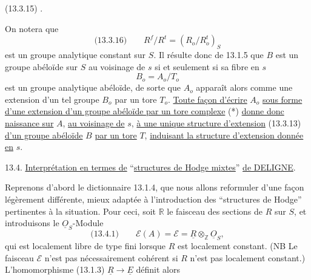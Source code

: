 
(13.3.15)
.

On notera que
\[
\text{(13.3.16)}\qquad R^f/R^t=(R_o/R_o^t)_S
\]
est un groupe analytique constant sur $S$. Il résulte donc de 13.1.5 que $B$ est un groupe abéloïde sur $S$ au voisinage de $s$ si et seulement si sa fibre en $s$
\[
B_o=A_o/T_o
\]
est un groupe analytique abéloïde, de sorte que $A_o$ apparaît alors comme une extension d'un tel groupe $B_o$ par un tore $T_o$. \uline{Toute façon d'écrire} $A_o$ \uline{sous forme d'une extension d'un groupe abéloïde par un tore complexe} (*) \uline{donne donc naissance sur} $A$, \uline{au voisinage de} $s$, \uline{à une unique structure d'extension} (13.3.13) \uline{d'un groupe abéloïde} $B$ \uline{par un tore} $T$, \uline{induisant la structure d'extension donnée en} $s$.

13.4. \uline{Interprétation en termes de} ``\uline{structures de Hodge mixtes}'' \uline{de DELIGNE}.

Reprenons d'abord le dictionnaire 13.1.4, que nous allons reformuler d'une façon légèrement différente, mieux adaptée à l'introduction des ``structures de Hodge'' pertinentes à la situation. Pour ceci, soit $\mathbb R$ le faisceau des sections de $R$ sur $S$, et introduisons le $\underline O_S$-Module
\[
\text{(13.4.1)}\qquad \mathcal E(A)=\mathcal E=\underline R\otimes_{\mathbb Z}\underline O_S,
\]
qui est localement libre de type fini lorsque $R$ est localement constant. (NB Le faisceau $\mathcal E$ n'est pas nécessairement cohérent si $R$ n'est pas localement constant.) L'homomorphisme (13.1.3) $\underline R\longrightarrow\underline E$ définit alors

